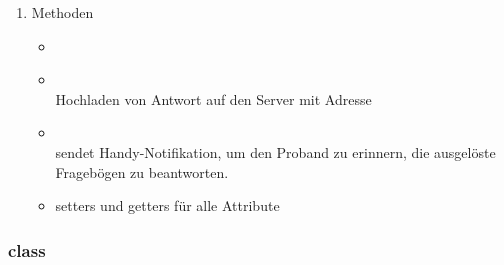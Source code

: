 \documentclass[a4paper]{scrreprt}
\begin{document}
{\begin{enumerate}
\begin{itemize}
\begin{itemize}
                                    \end{itemize}
                                \item {\large {}} \\
                                    Ergebnis der ``and'' Operation mit allen Elemente in \\
                                    z.B. sensorValues = {true, true, false, true}, dann \\
                                \item {\large {}}\\
                                    Verwaltung von allen Snesoren
                            \end{itemize}
                        \item Methoden
                            \begin{itemize}
                                \item {\large {}}
                                \item {\large {}}\\
                                    Hochladen von Antwort auf den Server mit Adresse 
                                \item {\large {}}\\
                                    sendet Handy-Notifikation, um den Proband zu erinnern, die ausgelöste Fragebögen zu beantworten.
                                \item {\large setters und getters für alle Attribute}
                            \end{itemize}
                    \end{enumerate}

                \subsubsection{class }

}
\end{document}
